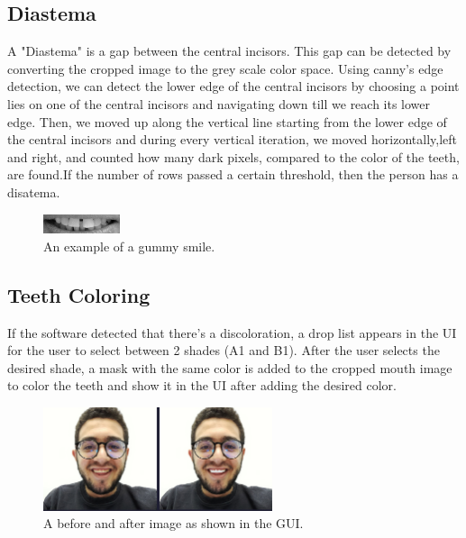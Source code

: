 \documentclass[conference,twocolumn]{IEEEtran}
\begin{document}
\subsection{Diastema}
A "Diastema" is a gap between the central incisors. 
This gap can be detected by converting the cropped image to the grey scale color space. Using canny's edge detection, we can detect the lower edge of the central incisors by choosing a point lies on one of the central incisors and navigating down till we reach its lower edge. 
Then, we moved up along the vertical line starting from
the lower edge of the central incisors and during every vertical iteration, we moved horizontally,left and right, and counted how many dark pixels, compared to the color of the teeth, are found.If the number of rows passed a certain threshold, then the person has a disatema.
\begin{figure}[H]
    \centering
    \includegraphics[width=0.2\textwidth]{diastemapng.png}
    \caption{An example of a gummy smile.}
    \label{fig:my_label}
\end{figure}
\subsection{Teeth Coloring}
If the software detected that there's a discoloration, a drop list appears in the UI for the user to select between 2 shades (A1 and B1).
After the user selects the desired shade, a mask with the same color is added to the cropped mouth image to color the teeth and show it in the UI after adding the desired color. 
\begin{figure}[H]
    \centering
    \includegraphics[width=0.6\textwidth]{coloring.png}
    \caption{A before and after image as shown in the GUI.}
    \label{fig:my_label}
\end{figure}
\end{document}
